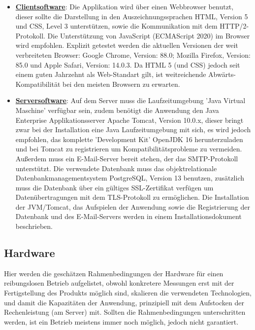 \documentclass{article}
\begin{document}
\begin{itemize}
\item \underline{\textbf{Clientsoftware}}: \linebreak
Die Applikation wird über einen Webbrowser benutzt, dieser sollte die Darstellung in den Auszeichnungssprachen HTML, Version 5 und CSS, Level 3 unterstützen, sowie die Kommunikation mit dem HTTP/2-Protokoll. Die Unterstützung von JavaScript (ECMAScript 2020) im Browser wird empfohlen. Explizit getestet werden die aktuellen Versionen der weit verbreiteten Browser: Google Chrome, Version: 88.0; Mozilla Firefox, Version: 85.0 und Apple Safari, Version: 14.0.3. Da HTML 5 (und CSS) jedoch seit einem guten Jahrzehnt als Web-Standart gilt, ist weitreichende Abwärts-Kompatibilität bei den meisten Browsern zu erwarten.  

\item \underline{\textbf{Serversoftware}}: \linebreak
Auf dem Server muss die Laufzeitumgebung 'Java Virtual Maschine' verfügbar sein, zudem benötigt die Anwendung den Java Enterprise Applikationsserver Apache Tomcat, Version 10.0.x, dieser bringt zwar bei der Installation eine Java Laufzeitumgebung mit sich, es wird jedoch empfohlen, das komplette 'Development Kit' OpenJDK 16 herunterzuladen und bei Tomcat zu registrieren um Kompatibilitätsprobleme zu vermeiden. Außerdem muss ein E-Mail-Server bereit stehen, der das SMTP-Protokoll unterstützt. Die verwendete Datenbank muss das objektrelationale Datenbankmanagementsystem PostgreSQL, Version 13 benutzen, zusätzlich muss die Datenbank über ein gültiges SSL-Zertifikat verfügen um Datenübertragungen mit dem TLS-Protokoll zu ermöglichen. Die Installation der JVM/Tomcat, das Aufspielen der Anwendung sowie die Registrierung der Datenbank und des E-Mail-Servers werden in einem Installationsdokument beschrieben.
\end{itemize}

\subsection{Hardware}

Hier werden die geschätzen Rahmenbedingungen der Hardware für einen reibungslosen Betrieb aufgelistet, obwohl konkretere Messungen erst mit der Fertigstellung des Produkts möglich sind, skalieren die verwendeten Technologien, und damit die Kapazitäten der Anwendung, prinzipiell mit dem Aufstocken der Rechenleistung (am Server) mit. Sollten die Rahmenbedingungen unterschritten werden, ist ein Betrieb meistens immer noch möglich, jedoch nicht garantiert.
\end{document}
